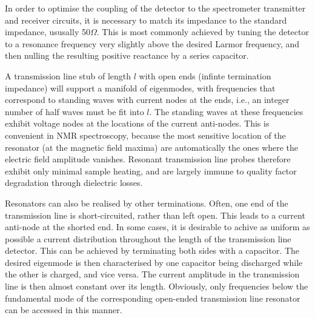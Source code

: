 In order to optimise the coupling of the detector to the spectrometer transmitter and 
receiver circuits, it is necessary to match its impedance to the standard impedance,
ususally 50$\Omega$. This is most commonly achieved by tuning the detector to a resonance
frequency very slightly above the desired Larmor frequency, and then nulling the resulting
positive reactance by a series capacitor. 

A transmission line stub of length $l$ with open ends (infinte termination impedance) will support
a manifold of eigenmodes, with frequencies that correspond to standing waves with current nodes
at the ends, i.e., an integer number of half waves must be fit into $l$. The standing waves at these
frequencies exhibit voltage nodes at the locations of the current anti-nodes. This is convenient in 
NMR spectroscopy, because the most sensitive location of the resonator (at the 
magnetic field maxima) are automatically the ones where the electric field amplitude vanishes.
Resonant transmission line probes therefore exhibit only minimal sample heating, and 
are largely immune to quality factor degradation through dielectric losses.

Resonators can also be realised by other terminations. Often, one end of the transmission line
is short-circuited, rather than left open. This leads to a current anti-node at the shorted
end. 
In some cases, it is desirable to achive as uniform as possible a current distribution throughout
the length of the transmission line detector. This can be achieved by terminating both sides with
a capacitor. The desired eigenmode is then characterised by one capacitor being discharged
while the other is charged, and vice versa. The current amplitude in the transmission line
is then almost constant over its length. Obviously, only frequencies below the fundamental
mode of the corresponding open-ended transmission line resonator can be accessed in this manner.


